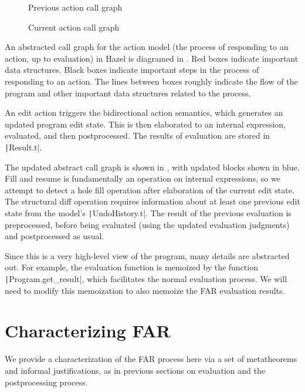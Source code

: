 \begin{figure}
  \centering
  
  \caption{Previous action call graph}
  \label{fig:prev-evaluation-call-graph}
\end{figure}

\begin{figure}
  \centering
  
  \caption{Current action call graph}
  \label{fig:current-evaluation-call-graph}
\end{figure}

An abstracted call graph for the action model (the process of responding to an action, up to evaluation) in Hazel is diagramed in . Red boxes indicate important data structures. Black boxes indicate important steps in the process of responding to an action. The lines between boxes roughly indicate the flow of the program and other important data structures related to the process.

An edit action triggers the bidirectional action semantics, which generates an updated program edit state. This is then elaborated to an internal expression, evaluated, and then postprocessed. The results of evaluation are stored in \texttt|Result.t|.

The updated abstract call graph is shown in , with updated blocks shown in blue. Fill and resume is fundamentally an operation on internal expressions, so we attempt to detect a hole fill operation after elaboration of the current edit state. The structural diff operation requires information about at least one previous edit state from the model's \texttt|UndoHistory.t|. The result of the previous evaluation is preprocessed, before being evaluated (using the updated evaluation judgments) and postprocessed as usual.

Since this is a very high-level view of the program, many details are abstracted out. For example, the evaluation function is memoized by the function \texttt|Program.get_result|, which facilitates the normal evaluation process. We will need to modify this memoization to also memoize the FAR evaluation results.

\section{Characterizing FAR}
\label{sec:far-metatheorems}

We provide a characterization of the FAR process here via a set of metatheorems and informal justifications, as in previous sections on evaluation and the postprocessing process.

